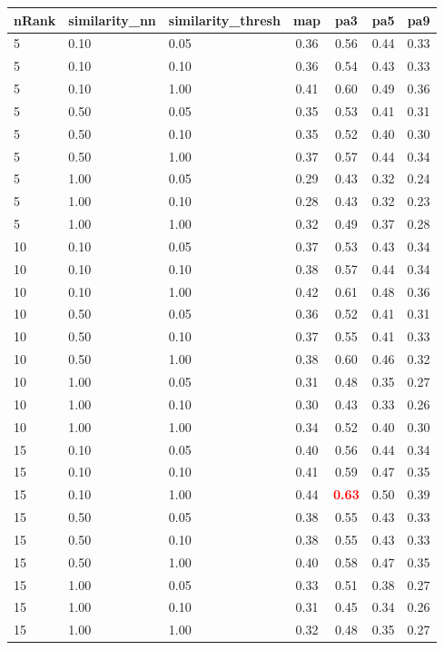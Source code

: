 \begin{tabular}{lllcccc} 
nRank & similarity\_nn & similarity\_thresh & map & pa3 & pa5 & pa9 \\ 
\hline 
 5 & 0.10 & 0.05 & 0.36 & 0.56 & 0.44 & 0.33 \\ 
 5 & 0.10 & 0.10 & 0.36 & 0.54 & 0.43 & 0.33 \\ 
 5 & 0.10 & 1.00 & 0.41 & 0.60 & 0.49 & 0.36 \\ 
 5 & 0.50 & 0.05 & 0.35 & 0.53 & 0.41 & 0.31 \\ 
 5 & 0.50 & 0.10 & 0.35 & 0.52 & 0.40 & 0.30 \\ 
 5 & 0.50 & 1.00 & 0.37 & 0.57 & 0.44 & 0.34 \\ 
 5 & 1.00 & 0.05 & 0.29 & 0.43 & 0.32 & 0.24 \\ 
 5 & 1.00 & 0.10 & 0.28 & 0.43 & 0.32 & 0.23 \\ 
 5 & 1.00 & 1.00 & 0.32 & 0.49 & 0.37 & 0.28 \\ 
10 & 0.10 & 0.05 & 0.37 & 0.53 & 0.43 & 0.34 \\ 
10 & 0.10 & 0.10 & 0.38 & 0.57 & 0.44 & 0.34 \\ 
10 & 0.10 & 1.00 & 0.42 & 0.61 & 0.48 & 0.36 \\ 
10 & 0.50 & 0.05 & 0.36 & 0.52 & 0.41 & 0.31 \\ 
10 & 0.50 & 0.10 & 0.37 & 0.55 & 0.41 & 0.33 \\ 
10 & 0.50 & 1.00 & 0.38 & 0.60 & 0.46 & 0.32 \\ 
10 & 1.00 & 0.05 & 0.31 & 0.48 & 0.35 & 0.27 \\ 
10 & 1.00 & 0.10 & 0.30 & 0.43 & 0.33 & 0.26 \\ 
10 & 1.00 & 1.00 & 0.34 & 0.52 & 0.40 & 0.30 \\ 
15 & 0.10 & 0.05 & 0.40 & 0.56 & 0.44 & 0.34 \\ 
15 & 0.10 & 0.10 & 0.41 & 0.59 & 0.47 & 0.35 \\ 
15 & 0.10 & 1.00 & 0.44 & \textbf{\textcolor{red}{0.63}} & 0.50 & 0.39 \\ 
15 & 0.50 & 0.05 & 0.38 & 0.55 & 0.43 & 0.33 \\ 
15 & 0.50 & 0.10 & 0.38 & 0.55 & 0.43 & 0.33 \\ 
15 & 0.50 & 1.00 & 0.40 & 0.58 & 0.47 & 0.35 \\ 
15 & 1.00 & 0.05 & 0.33 & 0.51 & 0.38 & 0.27 \\ 
15 & 1.00 & 0.10 & 0.31 & 0.45 & 0.34 & 0.26 \\ 
15 & 1.00 & 1.00 & 0.32 & 0.48 & 0.35 & 0.27 \\ 

\end{tabular}
